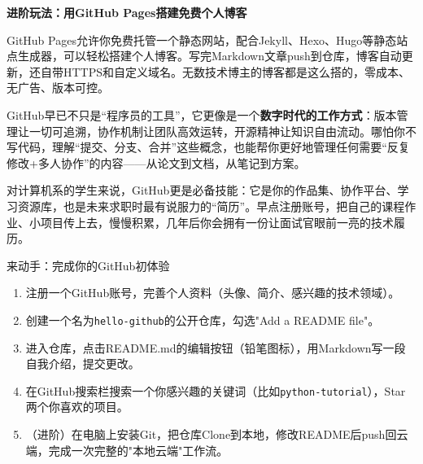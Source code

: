 \textbf{进阶玩法：用GitHub Pages搭建免费个人博客}\par

GitHub Pages允许你免费托管一个静态网站，配合Jekyll、Hexo、Hugo等静态站点生成器，可以轻松搭建个人博客。写完Markdown文章push到仓库，博客自动更新，还自带HTTPS和自定义域名。无数技术博主的博客都是这么搭的，零成本、无广告、版本可控。


GitHub早已不只是“程序员的工具”，它更像是一个\textbf{数字时代的工作方式}：版本管理让一切可追溯，协作机制让团队高效运转，开源精神让知识自由流动。哪怕你不写代码，理解“提交、分支、合并”这些概念，也能帮你更好地管理任何需要“反复修改+多人协作”的内容——从论文到文档，从笔记到方案。

对计算机系的学生来说，GitHub更是必备技能：它是你的作品集、协作平台、学习资源库，也是未来求职时最有说服力的“简历”。早点注册账号，把自己的课程作业、小项目传上去，慢慢积累，几年后你会拥有一份让面试官眼前一亮的技术履历。

\begin{tcbpractice}{来动手：完成你的GitHub初体验}
\begin{enumerate}
  \item 注册一个GitHub账号，完善个人资料（头像、简介、感兴趣的技术领域）。
  \item 创建一个名为\texttt{hello-\allowbreak github}的公开仓库，勾选"Add a README file"。
  \item 进入仓库，点击README.md的编辑按钮（铅笔图标），用Markdown写一段自我介绍，提交更改。
  \item 在GitHub搜索栏搜索一个你感兴趣的关键词（比如\texttt{python-\allowbreak tutorial}），Star两个你喜欢的项目。
  \item （进阶）在电脑上安装Git，把仓库Clone到本地，修改README后push回云端，完成一次完整的"本地云端"工作流。
\end{enumerate}

\end{tcbpractice}
